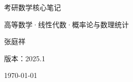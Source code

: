 \documentclass[12pt, oneside]{book}
\begin{document}
\begin{titlepage}
    \centering
    \vspace*{2cm}
    {考研数学核心笔记 \par}
    \vspace{0.5cm}
    {高等数学·线性代数·概率论与数理统计 \par}
    \vspace{2cm}
    {张庭祥 \par}
    \vspace{1cm}
    {版本：2025.1 \par}
    \vspace{3cm}
    \vfill
    {\today \par}
\end{titlepage}

\frontmatter

\tableofcontents
\listoffigures  %
\listoftables   %

\mainmatter

























\appendix


\backmatter
\printbibliography[title=参考文献]
\end{document}
